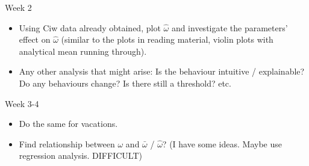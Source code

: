 \documentclass{article}
\begin{document}
Week 2

\begin{itemize}
	\item Using Ciw data already obtained, plot $\hat{\omega}$ and investigate the parameters' effect on $\hat{\omega}$ (similar to the plots in reading material, violin plots with analytical mean running through).
	\item Any other analysis that might arise: Is the behaviour intuitive / explainable? Do any behaviours change? Is there still a threshold? etc.
\end{itemize}

Week 3-4

\begin{itemize}
	\item Do the same for vacations.
	\item Find relationship between $\omega$ and $\bar{\omega}$ / $\hat{\omega}$? (I have some ideas. Maybe use regression analysis. DIFFICULT)
\end{itemize}









\end{document}
